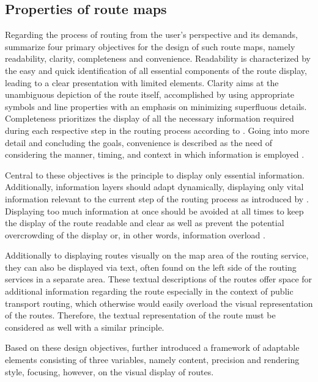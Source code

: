 \documentclass[agile, final]{copernicus-agile}
\begin{document}
\subsection{Properties of route maps}

Regarding the process of routing from the user's perspective and its demands, \citet{AgrawalaStolte2000} summarize four primary objectives for the design of such route maps, namely readability, clarity, completeness and convenience. Readability is characterized by the easy and quick identification of all essential components of the route display, leading to a clear presentation with limited elements. Clarity aims at the unambiguous depiction of the route itself, accomplished by using appropriate symbols and line properties with an emphasis on minimizing superfluous details. Completeness prioritizes the display of all the necessary information required during each respective step in the routing process according to \citet{Delikostidis2011}. Going into more detail and concluding the goals, convenience is described as the need of considering the manner, timing, and context in which information is employed \citep{AgrawalaStolte2000}.

Central to these objectives is the principle to display only essential information. Additionally, information layers should adapt dynamically, displaying only vital information relevant to the current step of the routing process as introduced by \citet{Delikostidis2011}. Displaying too much information at once should be avoided at all times to keep the display of the route readable and clear as well as prevent the potential overcrowding of the display or, in other words, information overload \citep{AgrawalaStolte2000}. 

Additionally to displaying routes visually on the map area of the routing service, they can also be displayed via text, often found on the left side of the routing services in a separate area. These textual descriptions of the routes offer space for additional information regarding the route especially in the context of public transport routing, which otherwise would easily overload the visual representation of the routes. Therefore, the textual representation of the route must be considered as well with a similar principle.

Based on these design objectives, \citet{AgrawalaStolte2000} further introduced a framework of adaptable elements consisting of three variables, namely content, precision and rendering style, focusing, however, on the visual display of routes. 
\end{document}
